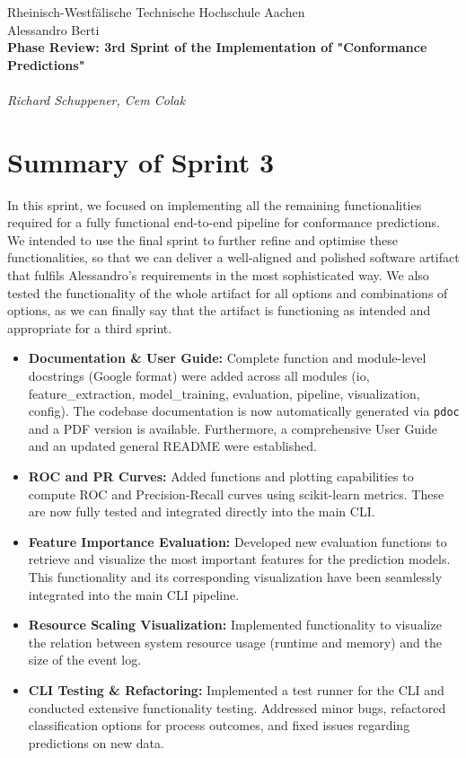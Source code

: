 \documentclass[12pt,a4paper]{article}
\begin{document}
\thispagestyle{empty}
\begin{center}
Rheinisch-Westf\"alische Technische Hochschule Aachen \\
Alessandro Berti\\[6ex]

\LARGE
	\textbf{Phase Review: 3rd Sprint of the Implementation of "Conformance Predictions"} \\[6ex]
        \\
	\textit{Richard Schuppener, Cem Colak} \\[6ex]
\end{center}

\newpage

\tableofcontents
\newpage

\section{Summary of Sprint 3}
In this sprint, we focused on implementing all the remaining functionalities required for a fully functional end-to-end pipeline for conformance predictions. We intended to use the final sprint to further refine and optimise these functionalities, so that we can deliver a well-aligned and polished software artifact that fulfils Alessandro's requirements in the most sophisticated way. We also tested the functionality of the whole artifact for all options and combinations of options, as we can finally say that the artifact is functioning as intended and appropriate for a third sprint.

\begin{itemize}
    \item \textbf{Documentation \& User Guide:} Complete function and module-level docstrings (Google format) were added across all modules (io, feature\_extraction, model\_training, evaluation, pipeline, visualization, config). The codebase documentation is now automatically generated via \texttt{pdoc} and a PDF version is available. Furthermore, a comprehensive User Guide and an updated general README were established.
    \item \textbf{ROC and PR Curves:} Added functions and plotting capabilities to compute ROC and Precision-Recall curves using scikit-learn metrics. These are now fully tested and integrated directly into the main CLI.
    \item \textbf{Feature Importance Evaluation:} Developed new evaluation functions to retrieve and visualize the most important features for the prediction models. This functionality and its corresponding visualization have been seamlessly integrated into the main CLI pipeline.
    \item \textbf{Resource Scaling Visualization:} Implemented functionality to visualize the relation between system resource usage (runtime and memory) and the size of the event log.
    \item \textbf{CLI Testing \& Refactoring:} Implemented a test runner for the CLI and conducted extensive functionality testing. Addressed minor bugs, refactored classification options for process outcomes, and fixed issues regarding predictions on new data.
\end{itemize}
\end{document}
